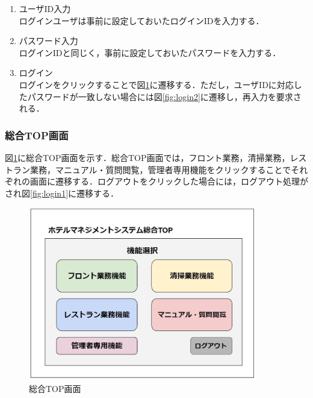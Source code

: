 \begin{enumerate}
\renewcommand{\labelenumi}{\textcircled{\scriptsize \theenumi}}
\item ユーザID入力\\ ログインユーザは事前に設定しておいたログインIDを入力する．
\item パスワード入力\\ ログインIDと同じく，事前に設定しておいたパスワードを入力する．
\item ログイン\\ ログインをクリックすることで図\ref{fig:TOP1}に遷移する．ただし，ユーザIDに対応したパスワードが一致しない場合には図\ref{fig:login2}に遷移し，再入力を要求される．
\end{enumerate}

\subsubsection{総合TOP画面}
図\ref{fig:TOP1}に総合TOP画面を示す．総合TOP画面では，フロント業務，清掃業務，レストラン業務，マニュアル・質問閲覧，管理者専用機能をクリックすることでそれぞれの画面に遷移する．ログアウトをクリックした場合には，ログアウト処理がされ図\ref{fig:login1}に遷移する．

\begin{figure}[H]
 \centering
   \includegraphics[width=100mm]{UI-umino/TOP1.JPG}
 \caption{総合TOP画面}
 \label{fig:TOP1}
\end{figure}

